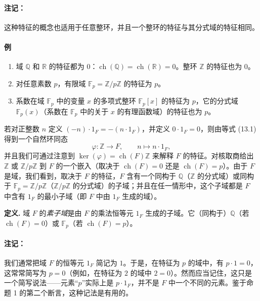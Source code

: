 \paragraph{注记：} 这种特征的概念也适用于任意整环，并且一个整环的特征与其分式域的特征相同。

\paragraph{例}
\begin{enumerate}[label=(\arabic*)]
	\item 域 $\mathbb Q$ 和 $\mathbb R$ 的特征都为 $0$：$\operatorname{ch}(\mathbb Q)=\operatorname{ch}(\mathbb R)=0$。整环 $\mathbb Z$ 的特征也为 $0$。
	\item 对任意素数 $p$，有限域 $\mathbb F_p=\mathbb Z/p\mathbb Z$ 的特征为 $p$。
	\item 系数在域 $\mathbb F_p$ 中的变量 $x$ 的多项式整环 $\mathbb F_p[x]$ 的特征为 $p$，它的分式域 $\mathbb F_p(x)$（系数在 $\mathbb F_p$ 中的关于 $x$ 的有理函数域）的特征也为 $p$。
\end{enumerate}

若对正整数 $n$ 定义 $(-n)\cdot 1_F=-(n\cdot 1_F)$，并定义 $0\cdot 1_F=0$，则由等式 (13.1) 得到一个自然环同态
\[
\varphi:\mathbb Z\longrightarrow F,
\qquad
n\longmapsto n\cdot 1_F,
\]
并且我们可通过注意到 $\ker(\varphi)=\operatorname{ch}(F)\mathbb Z$ 来解释 $F$ 的特征。对核取商给出 $\mathbb Z$ 或 $\mathbb Z/p\mathbb Z$ 到 $F$ 的一个嵌入（取决于 $\operatorname{ch}(F)=0$ 还是 $\operatorname{ch}(F)=p$）。由于 $F$ 是域，我们看到，取决于 $F$ 的特征，$F$ 含有一个同构于 $\mathbb Q$（$\mathbb Z$ 的分式域）或同构于 $\mathbb F_p=\mathbb Z/p\mathbb Z$（$\mathbb Z/p\mathbb Z$ 的分式域）的子域；并且在任一情形中，这个子域都是 $F$ 中含有 $1_F$ 的最小子域（即 $F$ 中由 $1_F$ 生成的域）。

\noindent\textbf{定义.} 域 $F$ 的\emph{素子域}是由 $F$ 的乘法恒等元 $1_F$ 生成的子域。它（同构于）$\mathbb Q$（若 $\operatorname{ch}(F)=0$）或 $\mathbb F_p$（若 $\operatorname{ch}(F)=p$）。

\paragraph{注记：} 我们通常把域 $F$ 的恒等元 $1_F$ 简记为 $1$。于是，在特征为 $p$ 的域中，有 $p\cdot 1=0$，这常常简写为 $p=0$（例如，在特征为 $2$ 的域中 $2=0$）。然而应当记住，这只是一个简写说法——元素“$p$”实际上是 $p\cdot 1_F$，并不是 $F$ 中一个不同的元素。鉴于命题 1 的第二个断言，这种记法是有用的。

